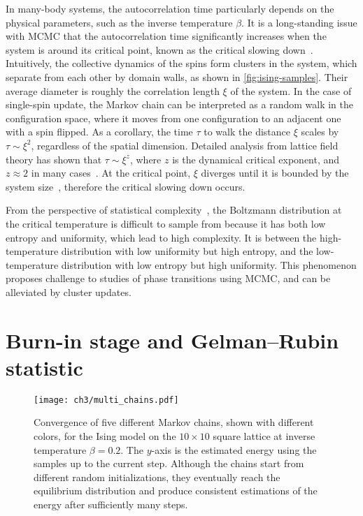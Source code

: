 In many-body systems, the autocorrelation time particularly depends on the physical parameters, such as the inverse temperature $\beta$. It is a long-standing issue with MCMC that the autocorrelation time significantly increases when the system is around its critical point, known as the critical slowing down~\cite{goodman1989multigrid, wolff1990critical}. Intuitively, the collective dynamics of the spins form clusters in the system, which separate from each other by domain walls, as shown in \cref{fig:ising-samples}. Their average diameter is roughly the correlation length $\xi$ of the system. In the case of single-spin update, the Markov chain can be interpreted as a random walk in the configuration space, where it moves from one configuration to an adjacent one with a spin flipped. As a corollary, the time $\tau$ to walk the distance $\xi$ scales by $\tau \sim \xi^2$, regardless of the spatial dimension. Detailed analysis from lattice field theory has shown that $\tau \sim \xi^z$, where $z$ is the dynamical critical exponent, and $z \approx 2$ in many cases~\cite{hohenberg1977theory}. At the critical point, $\xi$ diverges until it is bounded by the system size~\cite{lubetzky2012critical}, therefore the critical slowing down occurs.

From the perspective of statistical complexity~\cite{lopez1995statistical}, the Boltzmann distribution at the critical temperature is difficult to sample from because it has both low entropy and uniformity, which lead to high complexity. It is between the high-temperature distribution with low uniformity but high entropy, and the low-temperature distribution with low entropy but high uniformity. This phenomenon proposes challenge to studies of phase transitions using MCMC, and can be alleviated by cluster updates.

\section{Burn-in stage and Gelman--Rubin statistic}

\begin{figure}[htb]
\centering
\texttt{[image: ch3/multi\_chains.pdf]}
\caption[Convergence of multiple Markov chains]{
Convergence of five different Markov chains, shown with different colors, for the Ising model on the $10 \times 10$ square lattice at inverse temperature $\beta = 0.2$.
The $y$-axis is the estimated energy using the samples up to the current step.
Although the chains start from different random initializations, they eventually reach the equilibrium distribution and produce consistent estimations of the energy after sufficiently many steps.
}
\label{fig:multi-chains}
\end{figure}


